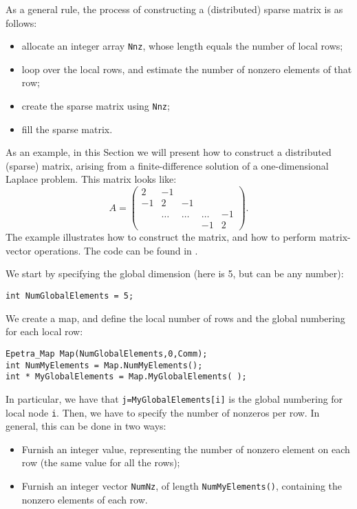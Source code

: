 As a general rule, the process of constructing a (distributed) sparse
matrix is as follows:
\begin{itemize}
\item allocate an integer array \verb!Nnz!, whose length equals the
  number of local rows;
\item loop over the local rows, and estimate the number of nonzero
  elements of that row;
\item create the sparse matrix using \verb!Nnz!;
\item fill the sparse matrix.
\end{itemize}

As an example, in this Section we will present how to construct a
distributed (sparse) matrix, arising from a finite-difference solution
of a one-dimensional Laplace problem. This matrix looks like:
\begin{equation*}
A = \begin{pmatrix}
 2 & -1 &     &   &    \\
-1 &  2     & -1     &        &    \\
   & \ldots & \ldots & \ldots & -1 \\
   &        &        & -1     & 2
\end{pmatrix}.
\end{equation*}
The example illustrates how to construct the matrix,
and how to perform matrix-vector operations.
The code can be found in .

We start by specifying the global dimension (here is 5, but can be any
number):
\begin{verbatim}
int NumGlobalElements = 5;
\end{verbatim}
We create a map, and define the local number of rows and the
global numbering for each local row:
\begin{verbatim}
Epetra_Map Map(NumGlobalElements,0,Comm);
int NumMyElements = Map.NumMyElements();
int * MyGlobalElements = Map.MyGlobalElements( );
\end{verbatim}
In particular, we have that \verb!j=MyGlobalElements[i]! is the global
numbering for local node \verb!i!.  Then, we have to specify the number
of nonzeros per row. In general, this can be done in two ways:
\begin{itemize}
\item Furnish an integer value, representing the number of nonzero
  element on each row (the same value for all the rows);
\item Furnish an integer vector \verb!NumNz!, of length
  \verb!NumMyElements()!, containing the nonzero elements of each row.
\end{itemize}

